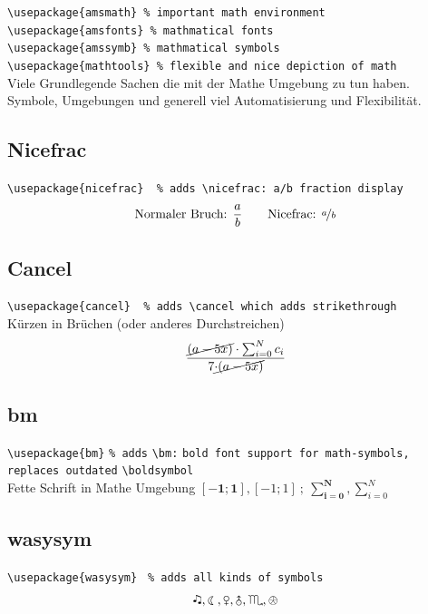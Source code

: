 \documentclass[notitlepage, 11pt, a4paper,ngerman]{article}
\begin{document}
\verb|\usepackage{amsmath} % important math environment|\\
\verb|\usepackage{amsfonts} % mathmatical fonts|\\
\verb|\usepackage{amssymb} % mathmatical symbols|\\
\verb|\usepackage{mathtools} % flexible and nice depiction of math|\\[10pt]
Viele Grundlegende Sachen die mit der Mathe Umgebung zu tun haben. Symbole, Umgebungen und generell viel Automatisierung und Flexibilität.

\subsection{Nicefrac}

\verb|\usepackage{nicefrac}  % adds \nicefrac: a/b fraction display|\\[10pt]
\begin{equation}
\textrm{Normaler Bruch: } \frac{a}{b} \qquad \textrm{Nicefrac: } \nicefrac{a}{b}
\end{equation}

\subsection{Cancel}

\verb|\usepackage{cancel}  % adds \cancel which adds strikethrough|\\[10pt]
Kürzen in Brüchen (oder anderes Durchstreichen)
\begin{equation}
\frac{\cancel{(a - 5x)} \cdot \sum_{i=0}^{N} c_i}{7 \cancel{\cdot (a - 5x)}}
\end{equation}

\subsection{bm}

\verb|\usepackage{bm}| \texttt{\% adds} \verb|\bm:| \texttt{bold font support for math-symbols, replaces outdated} \verb|\boldsymbol|\\[10pt]
Fette Schrift in Mathe Umgebung $ \bm{[-1;1]} , [-1;1] \ ; \ \bm{\sum_{i=0}^{N}}, \sum_{i=0}^{N}$

\subsection{wasysym}

\verb|\usepackage{wasysym}| \texttt{ \% adds all kinds of symbols}\\[10pt]
\begin{equation}
\twonotes, \leftmoon, \venus, \uranus, \scorpio, \APLlog
\end{equation}
\end{document}
